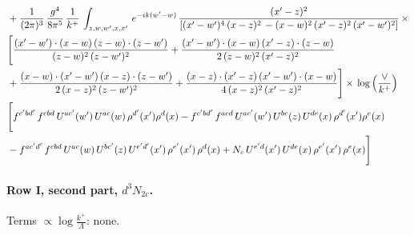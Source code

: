 \documentclass[10pt]{article}
\numberwithin{equation}{section}
\begin{document}
\begin{align}
&  + \frac{1}{(2\pi)^{3}}\, \frac{g^{4}}{8\pi^{5}}\,\frac{1}{k^{+}}\,\int_{z,w,w^{\prime},x,x'}\, e^{-ik(w^{\prime}-w)}\, \frac{(x'-z)^{2}}{\left[(x'-w')^{4}\,(x-z)^{2}\, - (x-w)^{2}\, (x'-z)^{2}\,(x'-w')^{2}\right]}\,  \times\notag \\ & \Bigg[\frac{(x'-w')\cdot (x-w)\, (z-w)\cdot (z-w')}{(z-w)^{2}\, (z-w')^{2}}+\frac{(x'-w')\cdot (x-w)\, (x'-z)\cdot (z-w)}{2\, (z-w)^{2}\, (x'-z)^{2}}\notag \\ & +\frac{(x-w)\cdot (x'-w')\, (x-z)\cdot (z-w')}{2\, (x-z)^{2}\, (z-w')^{2}}+\frac{(x-z)\cdot (x'-z)\, (x'-w')\cdot (x-w)}{4\, (x-z)^{2}\, (x'-z)^{2}}\Bigg] \times\,\log{\left(\frac{\vee}{k^{+}}\right)} \notag \\ & \Bigg[f^{c'bd'}\,f^{cbd}\, U^{ac'}(w')\,U^{ac}(w)\,\rho^{d'}(x')\rho^{d}(x)- f^{c'bd'}\,f^{acd}\,U^{ac'}(w')\,U^{bc}(z)\,U^{de}(x)\,\rho^{d'}(x')\rho^{e}(x) \notag \\ & -f^{ac'd'}\,f^{cbd}\,U^{ac}(w)\,U^{bc'}(z)\,U^{e'd'}(x')\,\rho^{e'}(x')\,\rho^{d}(x) +N_{c}\,U^{e'd}(x')\,U^{de}(x)\,\rho^{e'}(x')\,\rho^{e}(x)\Bigg] \label{eq:B:G2I2b}
\end{align}

\paragraph{Row I, second part, $d^3N_{2c}$.}
\noindent Terms $\propto\log\frac{k^+}{\Lambda}$: none.
\end{document}
